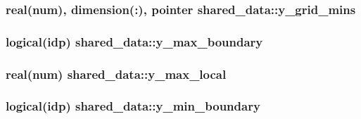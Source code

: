\subsubsection[{\texorpdfstring{y\+\_\+grid\+\_\+mins}{y_grid_mins}}]{\setlength{\rightskip}{0pt plus 5cm}real(num), dimension(\+:), pointer shared\+\_\+data\+::y\+\_\+grid\+\_\+mins}\hypertarget{namespaceshared__data_a54dff3f43983b04af43c4eb2d91dea38}{}\label{namespaceshared__data_a54dff3f43983b04af43c4eb2d91dea38}
\subsubsection[{\texorpdfstring{y\+\_\+max\+\_\+boundary}{y_max_boundary}}]{\setlength{\rightskip}{0pt plus 5cm}logical(idp) shared\+\_\+data\+::y\+\_\+max\+\_\+boundary}\hypertarget{namespaceshared__data_a72d92c74a360b173dd6bc143b5b376b4}{}\label{namespaceshared__data_a72d92c74a360b173dd6bc143b5b376b4}
\subsubsection[{\texorpdfstring{y\+\_\+max\+\_\+local}{y_max_local}}]{\setlength{\rightskip}{0pt plus 5cm}real(num) shared\+\_\+data\+::y\+\_\+max\+\_\+local}\hypertarget{namespaceshared__data_a0fb4b2d73929a142db79b38b0fdf8545}{}\label{namespaceshared__data_a0fb4b2d73929a142db79b38b0fdf8545}
\subsubsection[{\texorpdfstring{y\+\_\+min\+\_\+boundary}{y_min_boundary}}]{\setlength{\rightskip}{0pt plus 5cm}logical(idp) shared\+\_\+data\+::y\+\_\+min\+\_\+boundary}\hypertarget{namespaceshared__data_ac54278949a6918cd0e9ed158e4eadb52}{}\label{namespaceshared__data_ac54278949a6918cd0e9ed158e4eadb52}

